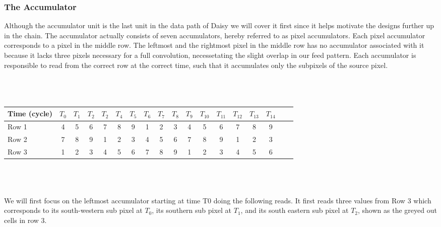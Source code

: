 \subsubsection{The Accumulator}
Although the accumulator unit is the last unit in the data path of Daisy we will cover it first since it helps motivate the designs further up in the chain.
The accumulator actually consists of seven accumulators, hereby referred to as pixel accumulators. Each pixel accumulator corresponds to a pixel in the middle row.
The leftmost and the rightmost pixel in the middle row has no accumulator associated with it because it lacks three pixels necessary for a full convolution, necessetating the slight overlap in our feed pattern.
Each accumulator is responsible to read from the correct row at the correct time, such that it accumulates only the subpixels of the source pixel.\\ \\ \\
\\
\begin{tabular}{l*{16}{c}r}
    Time (cycle)        & $T_{0}$ & $T_{1}$ & $T_{2}$ & $T_{2}$ & $T_{4}$  & $T_{5}$ & $T_{6}$ & $T_{7}$ & $T_{8}$ & $T_{9}$ & $T_{10}$ & $T_{11}$ & $T_{12}$ & $T_{13}$ & $T_{14}$\\
\hline
Row 1                   & 4 & 5 & 6 & 7 & 8 & 9 & \cellcolor{gray75} 1 & \cellcolor{gray75} 2 & \cellcolor{gray75} 3 & 4 & 5 & 6 & 7 & 8 & 9 & \\
Row 2                   & 7 & 8 & 9 & \cellcolor{gray75} 1 & \cellcolor{gray75} 2 & \cellcolor{gray75} 3 & 4 & 5 & 6 & 7 & 8 & 9 & \cellcolor{gray75} 1 & \cellcolor{gray75} 2 & \cellcolor{gray75} 3 & \\
Row 3                   & \cellcolor{gray75} 1 & \cellcolor{gray75} 2 & \cellcolor{gray75} 3 & 4 & 5 & 6 & 7 & 8 & 9 & \cellcolor{gray75} 1 & \cellcolor{gray75} 2 & \cellcolor{gray75} 3 & 4 & 5 & 6 & \\
\end{tabular}\\ \\ \\
We will first focus on the leftmost accumulator starting at time T0 doing the following reads. 
It first reads three values from Row 3 which corresponds to its south-western sub pixel at $T_{0}$, its southern sub pixel at $T_{1}$, and its south eastern sub pixel at $T_{2}$, shown as the greyed out cells in row 3.

